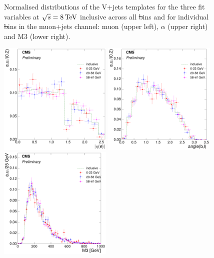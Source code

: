 \begin{figure}[hbtp]
	 \caption{Normalised distributions of the V+jets templates for the three fit variables at $\sqrt{s}=8\,\text{Te\hspace{-.08em}V}$
	 inclusive across all \st bins and for individual \st bins in the muon+jets channel: muon \abseta (upper
	 left), $\alpha$ (upper right) and M3 (lower right).}
     \label{fig:ST_fit_variable_vjets_comparisons_muon_8TeV}
\end{figure}


\begin{figure}[hbtp]
    \centering
     \includegraphics[width=0.48\textwidth]{Chapters/04_Analysis/04b_XSections/images/8TeV/fit_variables/electron/MT/electron_absolute_eta/vjets/MT_electron_absolute_eta_2orMoreBtags_VJets_template_comparison.pdf}\hfill
     \includegraphics[width=0.48\textwidth]{Chapters/04_Analysis/04b_XSections/images/8TeV/fit_variables/electron/MT/angle_bl/vjets/MT_angle_bl_2orMoreBtags_VJets_template_comparison.pdf}\hfill
     \includegraphics[width=0.48\textwidth]{Chapters/04_Analysis/04b_XSections/images/8TeV/fit_variables/electron/MT/M3/vjets/MT_M3_2orMoreBtags_VJets_template_comparison.pdf}\\

\end{figure}
